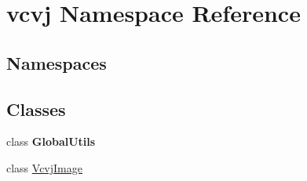 \hypertarget{namespacevcvj}{}\section{vcvj Namespace Reference}
\label{namespacevcvj}
\subsection*{Namespaces}
\begin{DoxyCompactItemize}
\end{DoxyCompactItemize}
\subsection*{Classes}
\begin{DoxyCompactItemize}
\item 
class {\bfseries Global\+Utils}
\item 
class \hyperlink{classvcvj_1_1_vcvj_image}{Vcvj\+Image}
\end{DoxyCompactItemize}
